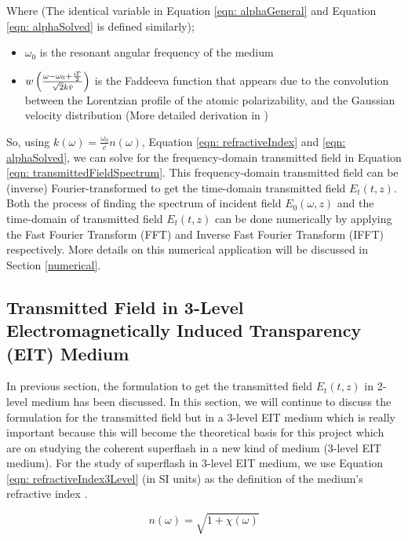 Where (The identical variable in Equation \ref{eqn: alphaGeneral} and Equation \ref{eqn: alphaSolved} is defined similarly);

\begin{itemize}
    \item $\omega_{0}$ is the resonant angular frequency of the medium
    \item $w\left(\frac{\omega - \omega_{0} + \frac{i\Gamma}{2}}{\sqrt{2}k\Bar{v}}\right)$ is the Faddeeva function that appears due to the convolution between the Lorentzian profile of the atomic polarizability, and the Gaussian velocity distribution \cite{Kwong2017} (More detailed derivation in \cite{abramowitz1965ia})
\end{itemize}

So, using $k(\omega) = \frac{\omega_{0}}{c}n(\omega)$, Equation \ref{eqn: refractiveIndex} and \ref{eqn: alphaSolved}, we can solve for the frequency-domain transmitted field in Equation \ref{eqn: transmittedFieldSpectrum}. This frequency-domain transmitted field can be (inverse) Fourier-transformed to get the time-domain transmitted field $E_{t}(t, z)$. Both the process of finding the spectrum of incident field $E_{0}(\omega, z)$ and the time-domain of transmitted field $E_{t}(t, z)$ can be done numerically by applying the Fast Fourier Transform (FFT) and Inverse Fast Fourier Transform (IFFT) respectively. More details on this numerical application will be discussed in Section \ref{numerical}.

\subsection{Transmitted Field in 3-Level Electromagnetically Induced Transparency (EIT) Medium}
In previous section, the formulation to get the transmitted field $E_{t}(t, z)$ in 2-level medium has been discussed. In this section, we will continue to discuss the formulation for the transmitted field but in a 3-level EIT medium which is really important because this will become the theoretical basis for this project which are on studying the coherent superflash in a new kind of medium (3-level EIT medium). For the study of superflash in 3-level EIT medium, we use Equation \ref{eqn: refractiveIndex3Level} (in SI units) as the definition of the medium's refractive index \cite{Braje2004, Jeong2009}.

\begin{equation}
    n(\omega) = \sqrt{1 + \chi(\omega)}
    \label{eqn: refractiveIndex3Level}
\end{equation}

